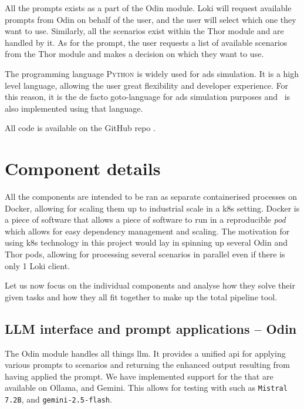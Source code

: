 All the prompts exists as a part of the Odin module. Loki will request available
prompts from Odin on behalf of the user, and the user will select which one they
want to use. Similarly, all the scenarios exist within the Thor module and are
handled by it. As for the prompt, the user requests a list of available
scenarios from the Thor module and makes a decision on which they want to use.

The programming language \textsc{Python} is widely used for \acrshort{ads} simulation. It is a high
level language, allowing the user great flexibility and developer experience.
For this reason, it is the de facto goto-language for \acrshort{ads} simulation
purposes and \hefe~is also implemented using that language.

All code is available on the GitHub repo
\href{https://github.com/orjahren/LLM4DD}{\hefe}.


\section{Component details}

All the components are intended to be ran as separate containerised processes on
Docker, allowing for scaling them up to industrial scale in a \acrfull{k8s}
setting. Docker is a piece of software that allows a piece of software to run in a
reproducible \emph{pod} which allows for easy dependency management and scaling.
The motivation for using \acrshort{k8s} technology in this project would lay in
spinning up several Odin and Thor pods, allowing for processing several
scenarios in parallel even if there is only \num{1} Loki client.

Let us now focus on the individual components and analyse how they solve their
given tasks and how they all fit together to make up the total \hefe{} pipeline
tool.

\subsection{LLM interface and prompt applications -- Odin}\label{sec:odinImplementation}

The Odin module handles all things \acrshort{llm}. It provides a unified
\acrshort{api} for applying various prompts to scenarios and returning the
enhanced output resulting from having applied the prompt. We have implemented
support for the  that are available on Ollama, and Gemini. This
allows for testing with  such as \texttt{Mistral \num{7.2}B},
and \texttt{gemini-2.5-flash}.

